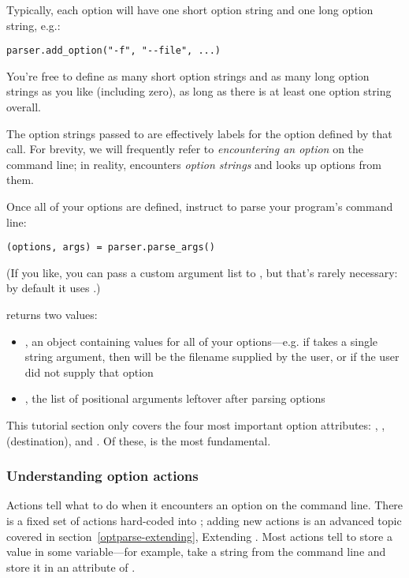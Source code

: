 Typically, each option will have one short option string and one long
option string, e.g.:
\begin{verbatim}
parser.add_option("-f", "--file", ...)
\end{verbatim}

You're free to define as many short option strings and as many long
option strings as you like (including zero), as long as there is at
least one option string overall.

The option strings passed to  are effectively labels for
the option defined by that call.  For brevity, we will frequently refer
to \emph{encountering an option} on the command line; in reality, 
encounters \emph{option strings} and looks up options from them.

Once all of your options are defined, instruct  to parse your
program's command line:
\begin{verbatim}
(options, args) = parser.parse_args()
\end{verbatim}

(If you like, you can pass a custom argument list to ,
but that's rarely necessary: by default it uses .)

 returns two values:
\begin{itemize}
\item {} 
, an object containing values for all of your options{---}e.g. if  takes a single string argument, then
 will be the filename supplied by the user, or
 if the user did not supply that option

\item {} 
, the list of positional arguments leftover after parsing
options

\end{itemize}

This tutorial section only covers the four most important option
attributes: , ,  (destination), and .
Of these,  is the most fundamental.


\subsubsection{Understanding option actions\label{optparse-understanding-option-actions}}

Actions tell  what to do when it encounters an option on the
command line.  There is a fixed set of actions hard-coded into ;
adding new actions is an advanced topic covered in section~\ref{optparse-extending}, Extending .
Most actions tell  to store a value in some variable{---}for
example, take a string from the command line and store it in an
attribute of .

